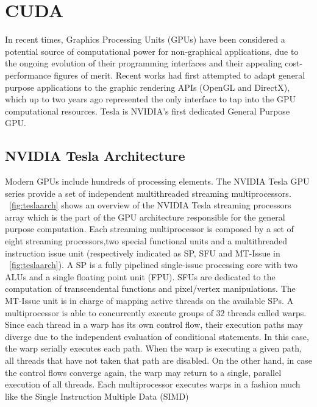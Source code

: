 \section{CUDA}
\label{sec:art_of_cuda}
   In recent times, Graphics Processing Units (GPUs) have been considered a potential source of computational
power for non-graphical applications, due to the ongoing evolution of their programming interfaces and their
appealing cost-performance figures of merit. Recent works had first attempted to adapt general purpose applications
to the graphic rendering APIs (OpenGL and DirectX), which up to two years ago represented the only interface to tap
into the GPU computational resources. Tesla is NVIDIA's first dedicated General Purpose GPU.
\newline
\subsection{NVIDIA Tesla Architecture}
   Modern GPUs include hundreds of processing elements. The NVIDIA Tesla GPU series provide a set
of independent multithreaded streaming multiprocessors. \figurename~\ref{fig:teslaarch} shows an overview of the NVIDIA
Tesla streaming processors array which is the part of the GPU architecture responsible for the general purpose computation.
Each streaming multiprocessor is composed by a set of eight streaming processors,two special functional units and a multithreaded
instruction issue unit (respectively indicated as SP, SFU and MT-Issue in \figurename~\ref{fig:teslaarch}).\newline
A SP is a fully pipelined single-issue processing core with two ALUs and a single floating point unit (FPU). 
SFUs are dedicated to the computation of transcendental functions and pixel/vertex manipulations.
The MT-Issue unit is in charge of mapping active threads on the available SPs.\newline
  A multiprocessor is able to concurrently execute groups of 32 threads called warps. Since each thread
in a warp has its own control flow, their execution paths may diverge due to the independent evaluation
of conditional statements. In this case, the warp serially executes each path. When the warp is executing
a given path, all threads that have not taken that path are disabled. On the other hand, in case the
control flows converge again, the warp may return to a single, parallel execution of all threads.\newline
 Each multiprocessor executes warps in a fashion much like the Single Instruction Multiple Data (SIMD)
